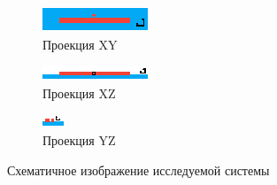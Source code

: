 \begin{figure}[h]

	\begin{subfigure}[b]{\textwidth}
		\centering
		\includegraphics[width=\textwidth]{img/scheme_xy2}
		\caption{Проекция XY}
		\label{fig:scheme_xy}
	\end{subfigure}
	\begin{subfigure}[b]{\textwidth}
		\centering
		\includegraphics[width=\textwidth]{img/scheme_xz}
		\caption{Проекция XZ}
		\label{fig:scheme_xz}
	\end{subfigure}
	\begin{subfigure}[b]{\textwidth}
		\centering
		\includegraphics[width=.7\textwidth]{img/scheme_yz2}
		\caption{Проекция YZ}
		\label{fig:scheme_yz}
	\end{subfigure}
	\caption{Схематичное изображение исследуемой системы}
	\label{fig:scheme}

\end{figure}